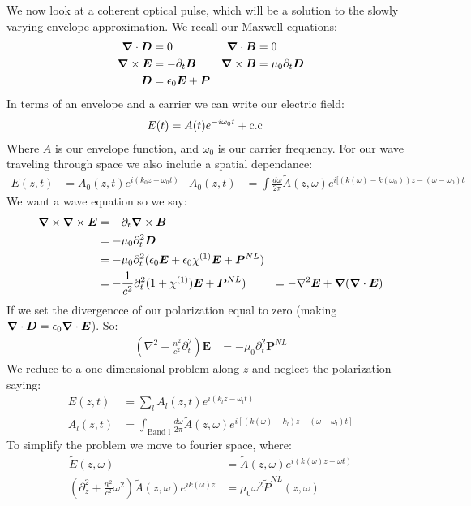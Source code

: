 We now look at a coherent optical pulse, which will be a solution to the slowly varying envelope approximation. We recall our Maxwell equations:
\begin{align*}
	\bm{\nabla}\cdot\bm{D} &= 0 & \bm{\nabla}\cdot\bm{B} &= 0 \\
	\bm{\nabla}\times\bm{E} &= -\partial_t \bm{B} & \bm{\nabla}\times\bm{B} &= \mu_0\partial_t \bm{D} \\
	\bm{D} &= \epsilon_0 \bm{E} + \bm{P}
\end{align*}
In terms of an envelope and a carrier we can write our electric field:
\begin{align*}
	E(t) &= A(t) e^{-i\omega_0 t} + \text{c.c}
\end{align*}
Where $A$ is our envelope function, and $\omega_0$ is our carrier frequency. For our wave traveling through space we also include a spatial dependance:
\begin{align*}
	E(z,t) &= A_0(z,t) e^{i(k_0 z - \omega_0 t)} & A_0(z,t) &= \int \frac{d\omega}{2\pi} \tilde{A}(z,\omega) e^{i[(k(\omega)- k(\omega_0)) z - (\omega-\omega_0)t}
\end{align*}
We want a wave equation so we say:
\begin{align*}
	\bm{\nabla}\times\bm{\nabla}\times\bm{E} &= -\partial_t \bm{\nabla}\times\bm{B} \\
	&= -\mu_0\partial_t^2\bm{D} \\
	&= -\mu_0\partial_t^2(\epsilon_0 \bm{E} + \epsilon_0\chi^{(1)} \bm{E} + \bm{P}^{NL}) \\
	&= -\frac{1}{c^2} \partial_t^2 (1+\chi^{(1)})\bm{E} + \bm{P}^{NL})
	&= -\nabla^2\bm{E} + \bm{\nabla}(\bm{\nabla}\cdot\bm{E})
\end{align*}
If we set the divergencce of our polarization equal to zero (making $\bm{\nabla}\cdot\bm{D} = \epsilon_0\bm{\nabla}\cdot\bm{E}$). So:
\begin{align*}
	\left(\nabla^2 - \frac{n^2}{c^2}\partial_t^2\right)\bm{E} &= -\mu_0\partial_t^2\bm{P}^{NL}
\end{align*}
We reduce to a one dimensional problem along $z$ and neglect the polarization saying:
\begin{align*}
	E(z,t) &= \sum_l A_l(z,t) e^{i(k_l z - \omega_l t)} \\
	A_l(z,t) &= \int_{\text{Band l}} \frac{d\omega}{2\pi} \tilde{A}(z,\omega) e^{i[(k(\omega) - k_l)z - (\omega - \omega_l)t]}
\end{align*}
To simplify the problem we move to fourier space, where:
\begin{align*}
	\tilde{E}(z,\omega) &= \tilde{A}(z,\omega)e^{i(k(\omega)z-\omega t)} \\
	\left(\partial_z^2 + \frac{n^2}{c^2} \omega^2\right)\tilde{A}(z,\omega) e^{ik(\omega)z} &= \mu_0\omega^2\tilde{P}^{NL}(z,\omega)
\end{align*}
